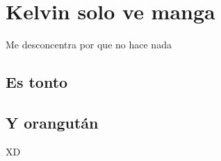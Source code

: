 \chapter{Kelvin solo ve manga}
Me desconcentra por que no hace nada
\section{Es tonto}

\section{Y orangután}
XD